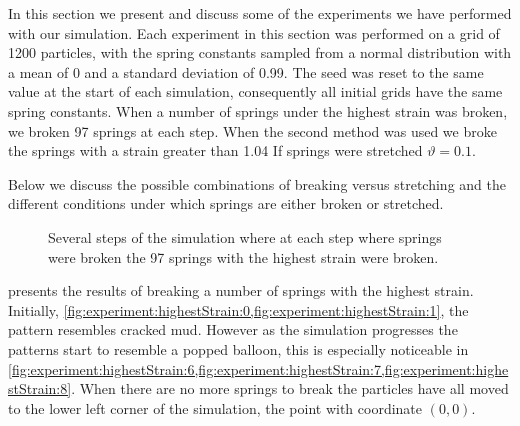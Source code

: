 In this section we present and discuss some of the experiments we have performed with our simulation. Each experiment in this section was performed on a grid of 1200 particles, with the spring constants sampled from a normal distribution with a mean of 0 and a standard deviation of 0.99. The seed was reset to the same value at the start of each simulation, consequently all initial grids have the same spring constants. When a number of springs under the highest strain was broken, we broken 97 springs at each step. When the second method was used we broke the springs with a strain greater than 1.04 If springs were stretched $\vartheta = 0.1$.

Below we discuss the possible combinations of breaking versus stretching and the different conditions under which springs are either broken or stretched.

\begin{figure*}
	\centering
						
	\caption{Several steps of the simulation where at each step where springs were broken the 97 springs with the highest strain were broken.}
	\label{fig:experiment:highestStrain}
\end{figure*}
 presents the results of breaking a number of springs with the highest strain. Initially, \cref{fig:experiment:highestStrain:0,fig:experiment:highestStrain:1}, the pattern resembles cracked mud. However as the simulation progresses the patterns start to resemble a popped balloon, this is especially noticeable in \cref{fig:experiment:highestStrain:6,fig:experiment:highestStrain:7,fig:experiment:highestStrain:8}. When there are no more springs to break the particles have all moved to the lower left corner of the simulation, the point with coordinate $(0,0)$.













% 						

